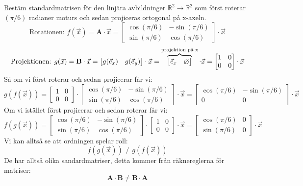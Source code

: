 \begin{Ex}
    Bestäm standardmatrisen för den linjära avbildninger $\mathbb{R}^2 \rightarrow \mathbb{R}^2$ som först roterar $(\pi/6)$ radianer moturs och sedan projiceras ortogonal på x-axeln.
    \[
        \mbox{Rotationen: } f(\vec{x}) = \mathbf{A} \cdot \vec{x} = \begin{bmatrix} \cos(\pi/6)&-\sin(\pi/6)\\\sin(\pi/6)&\cos(\pi/6) \end{bmatrix} \cdot \vec{x}
    \]
    \[
        \mbox{Projektionen: } g(\vec{x}) = \mathbf{B} \cdot \vec{x} = \begin{bmatrix} g(\vec{e}_x)&g(\vec{e}_y) \end{bmatrix} \cdot \vec{x} = \overbrace{\begin{bmatrix} \vec{e}_x&\o \end{bmatrix}}^\text{projektion på x} \cdot \vec{x}= \begin{bmatrix} 1&0\\0&0 \end{bmatrix} \cdot \vec{x}
    \]
    Så om vi först roterar och sedan projicerar får vi:
    \[
        g(f(\vec{x})) = \begin{bmatrix} 1&0\\0&0 \end{bmatrix} \cdot \begin{bmatrix} \cos(\pi/6)&-\sin(\pi/6)\\\sin(\pi/6)&\cos(\pi/6) \end{bmatrix} \cdot \vec{x} = \begin{bmatrix} \cos(\pi/6)&-\sin(\pi/6)\\0&0 \end{bmatrix} \cdot \vec{x}
    \]
    Om vi istället först projicerar och sedan roterar får vi:
    \[
        f(g(\vec{x})) = \begin{bmatrix} \cos(\pi/6)&-\sin(\pi/6)\\\sin(\pi/6)&\cos(\pi/6) \end{bmatrix} \cdot \begin{bmatrix} 1&0\\0&0 \end{bmatrix} \cdot \vec{x} = \begin{bmatrix} \cos(\pi/6)&0\\\sin(\pi/6)&0 \end{bmatrix} \cdot \vec{x}
    \]
    Vi kan alltså se att ordningen spelar roll:
    \[
        f(g(\vec{x})) \neq g(f(\vec{x}))
    \]
    De har alltså olika sandardmatriser, detta kommer från räknereglerna för matriser:
    \[
        \mathbf{A} \cdot \mathbf{B} \neq \mathbf{B} \cdot \mathbf{A}
    \]
\end{Ex}
